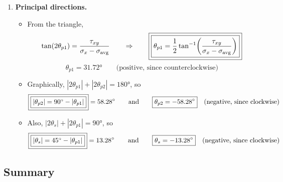 \documentclass[11pt]{article}
\begin{document}
\pagebreak
\begin{enumerate}[label=\arabic*), start=7]
  \item \textbf{Principal directions.}
  \begin{itemize}
    \item From the triangle,
          \[
            \tan(2\theta_{p1}) = \frac{\tau_{xy}}{\sigma_x - \sigma_{\text{avg}}}
            \qquad\Rightarrow\qquad
            \fbox{\fbox{$\displaystyle
              \theta_{p1} = \frac12 \tan^{-1}\!\left(\frac{\tau_{xy}}{\sigma_x - \sigma_{\text{avg}}}\right)$}}
          \]
          \[
            \boxed{\theta_{p1} = \ang{31.72}} \qquad \text{(positive, since counterclockwise)}
          \]
    \item Graphically, $|2\theta_{p1}| + |2\theta_{p2}| = \ang{180}$, so
          \[
            \fbox{\fbox{$|\theta_{p2}| = \ang{90} - |\theta_{p1}|$}} = \ang{58.28}
            \qquad\text{and}\qquad
            \boxed{\theta_{p2} = -\ang{58.28}} \quad \text{(negative, since clockwise)}
          \]
    \item Also, $|2\theta_s| + |2\theta_{p1}| = \ang{90}$, so
          \[
            \fbox{\fbox{$|\theta_s| = \ang{45} - |\theta_{p1}|$}} = \ang{13.28}
            \qquad\text{and}\qquad
            \boxed{\theta_s = -\ang{13.28}} \quad \text{(negative, since clockwise)}
          \]
  \end{itemize}
\end{enumerate}

\subsection*{Summary}

\begin{center}
\end{center}
\end{document}
